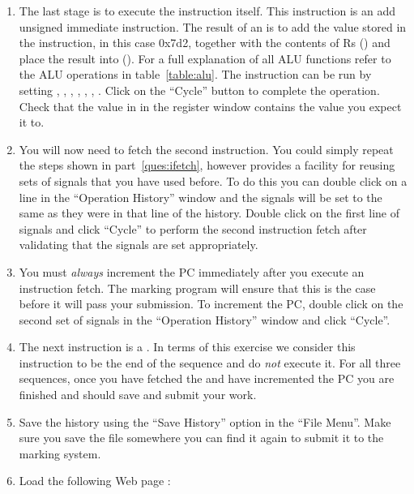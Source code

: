 \documentclass[a4paper,10pt]{article}
\begin{document}
\begin{enumerate}
\item The last stage is to execute the instruction itself. This
instruction is an add unsigned immediate instruction. The result of an
 is to add the value stored in the instruction, in this
case 0x7d2, together with the contents of Rs () and place
the result into \regd (). For a full explanation of all ALU
functions refer to the ALU operations in table~\ref{table:alu}. The
instruction can be run by setting ,
, , ,
, , . Click on
the ``Cycle'' button to complete the operation. Check that the value
in  in the register window contains the value you expect
it to.

\item You will now need to fetch the second instruction. You could
simply repeat the steps shown in part~\ref{ques:ifetch}, however
 provides a facility for reusing sets of signals that
you have used before. To do this you can double click on a line in the
``Operation History'' window and the signals will be set to the same
as they were in that line of the history. Double click on the first
line of signals and click ``Cycle'' to perform the second instruction
fetch after validating that the signals are set appropriately.

\item You must \textit{always} increment the PC immediately after you
execute an instruction fetch. The marking program will ensure that
this is the case before it will pass your submission. To increment the
PC, double click on the second set of signals in the ``Operation
History'' window and click ``Cycle''.

\item The next instruction is a . In terms of this
exercise we consider this instruction to be the end of the sequence
and do \textit{not} execute it. For all three sequences, once you have
fetched the  and have incremented the PC you are
finished and should save and submit your work.

\item Save the history using the ``Save History'' option in the ``File
Menu''. Make sure you save the file somewhere you can find it again to
submit it to the marking system.

\item Load the following Web page :



\end{enumerate}
\end{document}
